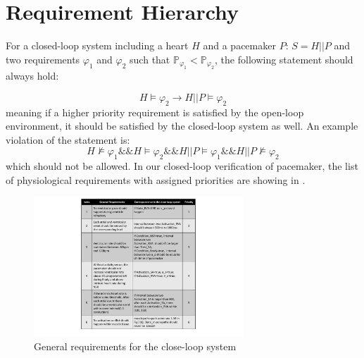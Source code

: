 \section{Requirement Hierarchy}
For a closed-loop system including a heart $H$ and a pacemaker $P$: $S=H || P$ and two requirements $\varphi_1$ and $\varphi_2$ such that $\mathbb{P}_{\varphi_1}<\mathbb{P}_{\varphi_2}$, the following statement should always hold:

$$H\models\varphi_2\rightarrow H||P\models\varphi_2$$
meaning if a higher priority requirement is satisfied by the open-loop environment, it should be satisfied by the closed-loop system as well. An example violation of the statement is:
$$H\not\models\varphi_1 \&\& H\models\varphi_2 \&\& H||P\models\varphi_1 \&\& H||P\not\models\varphi_2$$
which should not be allowed. In our closed-loop verification of pacemaker, the list of physiological requirements with assigned priorities are showing in .

\begin{figure}[!t]
	\center
	\includegraphics[width=0.7\textwidth]{figs/properties.pdf}
	\center
	\caption{General requirements for the close-loop system}
	\label{fig:properties}
\end{figure}



